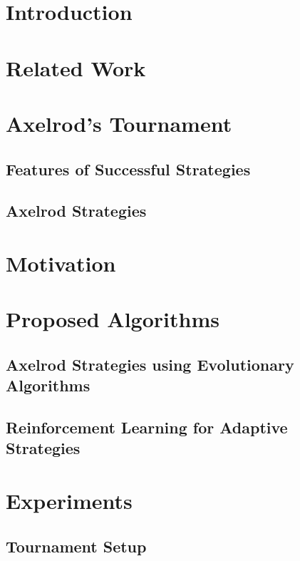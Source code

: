 \documentclass[a4paper]{article}
\begin{document}
	\section{Introduction}
	
	\section{Related Work}
	
	\section{Axelrod's Tournament}
	
	\subsection{Features of Successful Strategies}

	\subsection{Axelrod Strategies}	
	
	\section{Motivation}
	
	\section{Proposed Algorithms}
	
	\subsection{Axelrod Strategies using Evolutionary Algorithms}

	\subsection{Reinforcement Learning for Adaptive Strategies}
	
	\section{Experiments}
	
	\subsection{Tournament Setup}
	
\end{document}
